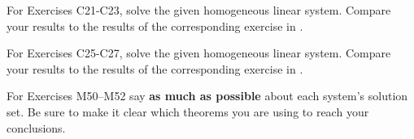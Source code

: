 %
%
\begin{exercisegroup}
\begin{para}For Exercises C21-C23, solve the given homogeneous linear system.  Compare your results to the results of the corresponding exercise in .\end{para}
%
\end{exercisegroup}
%
\begin{exercisegroup}
\begin{para}For Exercises C25-C27, solve the given homogeneous linear system.  Compare your results to the results of the corresponding exercise in .\end{para}
%
\end{exercisegroup}
%
%
%
\begin{exercisegroup}
\begin{para}For Exercises M50--M52  say {\bf as much as possible} about each system's solution set.  Be sure to make it clear which theorems you are using to reach your conclusions.\end{para}
\end{exercisegroup}
%
